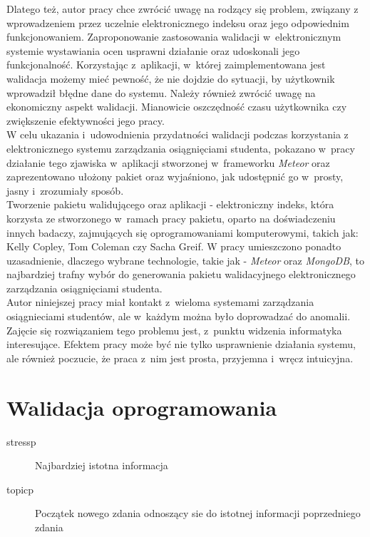 \documentclass[brudnopis]{xmgr}
\begin{document}
\textcolor{wc}{Dlatego też, autor pracy chce zwrócić uwagę na rodzący się problem, związany
z wprowadzeniem przez uczelnie elektronicznego indeksu oraz jego odpowiednim
funkcjonowaniem. Zaproponowanie zastosowania walidacji w~elektronicznym systemie
wystawiania ocen usprawni działanie oraz udoskonali jego funkcjonalność.
Korzystając z~aplikacji, w~której zaimplementowana jest walidacja możemy mieć pewność,
że nie dojdzie do sytuacji, by użytkownik wprowadził błędne dane do systemu.
Należy również zwrócić uwagę na ekonomiczny aspekt walidacji. Mianowicie oszczędność
czasu użytkownika czy zwiększenie efektywności jego pracy.}
\\
\indent \textcolor{wc}{W celu ukazania i~udowodnienia przydatności walidacji podczas korzystania
z elektronicznego systemu zarządzania osiągnięciami studenta, pokazano w~pracy
działanie tego zjawiska w~aplikacji stworzonej w~frameworku \textit{Meteor} oraz
zaprezentowano ułożony pakiet oraz wyjaśniono, jak udostępnić go w~prosty, jasny i~zrozumiały sposób.}
\\
\indent \textcolor{wd}{Tworzenie pakietu walidującego oraz aplikacji - elektroniczny indeks, która korzysta
ze stworzonego w~ramach pracy pakietu, oparto na doświadczeniu innych badaczy,
zajmujących się oprogramowaniami komputerowymi, takich jak: Kelly Copley, Tom
Coleman czy Sacha Greif.} \textcolor{wa}{W pracy umieszczono ponadto uzasadnienie, dlaczego wybrane
technologie, takie jak - \textit{Meteor} oraz \textit{MongoDB}, to najbardziej trafny wybór do generowania
pakietu walidacyjnego elektronicznego zarządzania osiągnięciami studenta.}
\\
\indent \textcolor{wa}{Autor niniejszej pracy miał kontakt z~wieloma systemami zarządzania osiągnieciami
studentów, ale w~każdym można było doprowadzać do anomalii. Zajęcie się rozwiązaniem
tego problemu jest, z~punktu widzenia informatyka interesujące. Efektem pracy może być
nie tylko usprawnienie działania systemu, ale również poczucie, że praca z~nim jest
prosta, przyjemna i~wręcz intuicyjna.}





\chapter{Walidacja oprogramowania}

\begin{description}
\item[stressp] \textcolor{sa}{Najbardziej istotna informacja}
\item[topicp] \textcolor{sb}{Początek nowego zdania odnoszący sie do istotnej informacji poprzedniego zdania}
\end{description}
\end{document}
